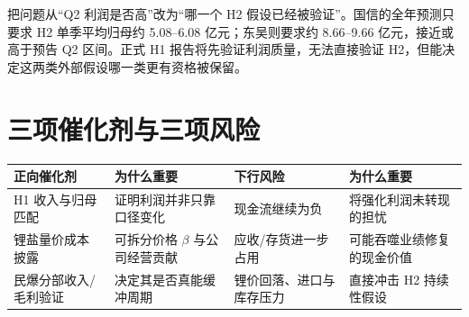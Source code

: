 \begin{keyinsight}[本报告给投资者的可执行问题]
把问题从“Q2 利润是否高”改为“哪一个 H2 假设已经被验证”。国信的全年预测只要求 H2 单季平均归母约 5.08--6.08 亿元；东吴则要求约 8.66--9.66 亿元，接近或高于预告 Q2 区间。正式 H1 报告将先验证利润质量，无法直接验证 H2，但能决定这两类外部假设哪一类更有资格被保留。
\end{keyinsight}

\section{三项催化剂与三项风险}

\begin{tabularx}{\linewidth}{L{2.4cm}X L{2.4cm}X}
\toprule
正向催化剂 & 为什么重要 & 下行风险 & 为什么重要 \\
\midrule
H1 收入与归母匹配 & 证明利润并非只靠口径变化 & 现金流继续为负 & 将强化利润未转现的担忧 \\
锂盐量价成本披露 & 可拆分价格 $\beta$ 与公司经营贡献 & 应收/存货进一步占用 & 可能吞噬业绩修复的现金价值 \\
民爆分部收入/毛利验证 & 决定其是否真能缓冲周期 & 锂价回落、进口与库存压力 & 直接冲击 H2 持续性假设 \\
\bottomrule
\end{tabularx}
